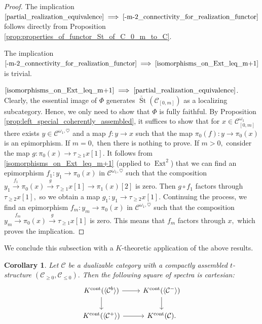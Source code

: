 \documentclass[11pt,leqno]{amsart}
\newcommand{\Implies}[2]{$\text{\ref{#1}}\implies\text{\ref{#2}}$}
\newtheorem{cor}[theo]{Corollary}
\numberwithin{equation}{section}
\newcommand{\xto}{\xrightarrow}
\newcommand{\cont}{\operatorname{cont}}
\newcommand{\St}{\operatorname{St}}
\newcommand{\cC}{{\mathcal C}}
\newcommand{\la}{\langle}
\newcommand{\ra}{\rangle}
\newcommand{\Ext}{\operatorname{Ext}}
\begin{document}
\begin{proof}
The implication \Implies{partial_realization_equivalence}{-m-2_connectivity_for_realization_functor} follows directly from Proposition \ref{prop:properties_of_functor_St_of_C_0_m_to_C}.

The implication \Implies{-m-2_connectivity_for_realization_functor}{isomorphisms_on_Ext_leq_m+1} is trivial.

\Implies{isomorphisms_on_Ext_leq_m+1}{partial_realization_equivalence}. Clearly, the essential image of $\Phi$ generates $\check{\St}(\cC_{[0,m]})$ as a localizing subcategory. Hence, we only need to show that $\Phi$ is fully faithful. By Proposition \ref{prop:left_special_coherently_assembled}, it suffices to show that for $x\in \cC^{\omega_1}_{[0,m]}$ there exists $y\in\cC^{\omega_1,\heartsuit}$ and a map $f:y\to x$ such that the map $\pi_0(f):y\to\pi_0(x)$ is an epimorphism. If $m=0,$ then there is nothing to prove. If $m>0,$ consider the map $g:\pi_0(x)\to\tau_{\geq 1}x[1].$ It follows from \ref{isomorphisms_on_Ext_leq_m+1} (applied to $\Ext^2$) that we can find an epimorphism $f_1:y_1\to\pi_0(x)$ in $\cC^{\omega_1,\heartsuit}$ such that the composition $y_1\xto{f_1}\pi_0(x)\xto{g}\tau_{\geq 1}x[1]\to\pi_1(x)[2]$ is zero. Then $g\circ f_1$ factors through $\tau_{\geq 2}x[1],$ so we obtain a map $g_1:y_1\to\tau_{\geq 2}x[1].$ Continuing the process, we find an epimorphism $f_m:y_m\to\pi_0(x)$ in $\cC^{\omega_1,\heartsuit}$ such that the composition $y_m\xto{f_m}\pi_0(x)\xto{g}\tau_{\geq 1}x[1]$ is zero. This means that $f_m$ factors through $x,$ which proves the implication.
\end{proof}



We conclude this subsection with a $K$-theoretic application of the above results.

\begin{cor}\label{cor:cartesian_square_C^-_C^+_C^b}
Let $\cC$ be a dualizable category with a compactly assembled $t$-structure $(\cC_{\geq 0},\cC_{\leq 0}).$ Then the following square of spectra is cartesian:
\begin{equation}\label{eq:cartesian_K_theory}
	\begin{tikzcd}
		K^{\cont}(\la \cC^b\ra) \ar[r]\ar[d] & K^{\cont}(\la \cC^-\ra)\ar[d]\\
		K^{\cont}(\la \cC^+\ra) \ar[r] & K^{\cont}(\cC).
	\end{tikzcd}
\end{equation}
\end{cor}
\end{document}
